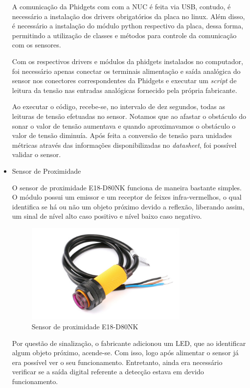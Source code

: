 \begin{itemize}
A comunicação da Phidgets com com a NUC é feita via USB, contudo, é necessário a instalação dos drivers obrigatórios da placa no linux. Além disso, é necessário a instalação do módulo python respectivo da placa, dessa forma, permitindo a utilização de classes e métodos para controle da comunicação com os sensores.

Com os respectivos drivers e módulos da phidgets instalados no computador, foi necessário apenas conectar os terminais alimentação e saída analógica do sensor nos conectores correspondentes da Phidgets e executar um \textit{script} de leitura da tensão nas entradas analógicas fornecido pela própria fabricante. 

Ao executar o código, recebe-se, no intervalo de dez segundos, todas as leituras de tensão efetuadas no sensor. Notamos que ao afastar o obstáculo do sonar o valor de tensão aumentava e quando aproximavamos o obstáculo o valor de tensão diminuía. Após feita a conversão de tensão para unidades métricas através das informações disponibilizadas no \textit{datasheet}, foi possível validar o sensor.

\item Sensor de Proximidade

O sensor de proximidade E18-D80NK funciona de maneira bastante simples. O módulo possui um emissor e um receptor de feixes infra-vermelhos, o qual identifica se há ou não um objeto próximo devido a reflexão, liberando assim, um sinal de nível alto caso positivo e nível baixo caso negativo.

\begin{figure}[!ht]
	\centering
	\includegraphics[width=8cm]{Figures/proximity_sensor.jpg}
	\caption{Sensor de proximidade E18-D80NK}
	\label{fig:E18-D80NK}
\end{figure}

Por questão de sinalização, o fabricante adicionou um LED, que ao identificar algum objeto próximo, acende-se. Com isso, logo após alimentar o sensor já era possível ver o seu funcionamento. Entretanto, ainda era necessário verificar se a saída digital referente a detecção estava em devido funcionamento.


\end{itemize}
